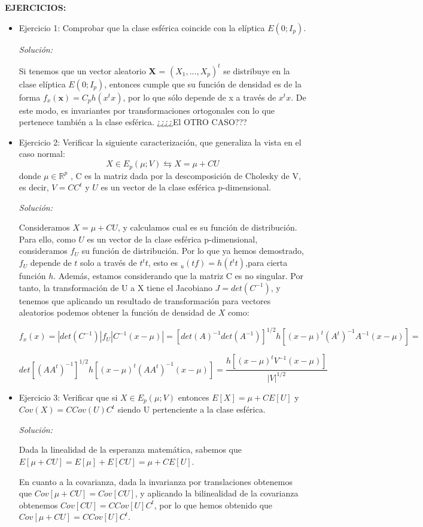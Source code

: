 \documentclass{article}
\theoremstyle{theorem-style}  %
\theoremstyle{definition}
\theoremstyle{example-style}
\begin{document}
	\textbf{EJERCICIOS:}
		\begin{itemize}
			\item Ejercicio 1: Comprobar que la clase esférica coincide con la elíptica $E(0; I_p )$.
			
			\textit{Solución:} 
			
			Si tenemos que un vector aleatorio \textbf{X} = $(X_1, ..., X_p)^t$ se distribuye en la clase elíptica $E(0; I_p )$, entonces cumple que su función de densidad es de la forma $f_x(\textbf{x}) = C_p h (x^tx)$, por lo que sólo depende de x a través de $x^tx$. De este modo, es invariantes por transformaciones ortogonales con lo que pertenece también a la clase esférica. ¿¿¿¿El OTRO CASO???
			
			\item Ejercicio 2: Verificar la siguiente caracterización, que generaliza la vista en el caso normal: $$ X \in E_p(\mu; V) \leftrightarrows X = \mu + CU $$ donde $\mu \in \mathbb{R}^p$ , C es la matriz dada por la descomposición de Cholesky de V, es decir, $V=CC^t$ y $U$ es un vector de la clase esférica p-dimensional.
			
			\textit{Solución:}
			
				Consideramos $X = \mu + CU $, y calculamos cual es su función de distribución. Para ello, como $U$ es un vector de la clase esférica p-dimensional, consideramos $f_U$ su función de distribución. Por lo que ya hemos demostrado, $f_U$ depende de $t$ solo a través de $t^tt$, esto es $_u(tf)=h(t^tt)$,para cierta función $h$. Además, estamos considerando que la matriz C es no singular. Por tanto, la transformación de U a X tiene el Jacobiano $J = det(C^{-1})$, y tenemos que aplicando un resultado de transformación para vectores aleatorios podemos obtener la función de densidad de $X$ como:
				
				\[
					f_x(x) = |det(C^{-1})| f_U |C^{-1}(x-\mu)| = [det(A)^{-1}det(A^{-1})]^{1/2}h[(x-\mu)^t(A^t)^{-1}A^{-1}(x-\mu)] =
				\]
								
				\[
									det[(AA^t)^{-1}]^{1/2}h[(x-\mu)^t(AA^t)^{-1}(x-\mu)] = \frac{h[(x-\mu)^tV^{-1}(x-\mu)]}{|V|^{1/2}}				
				\]
				
				
				
			\item Ejercicio 3: Verificar que si $X \in E_p(\mu; V)$  entonces $E[X] = \mu + CE[U]$ y $Cov(X)= C Cov(U)C^t$ siendo U pertenciente a la clase esférica.
			
			\textit{Solución:}
			
			Dada la linealidad de la esperanza matemática, sabemos que $E[\mu + CU] = E[\mu] + E[CU] = \mu + CE[U]$.
			
			En cuanto a la covarianza, dada la invarianza por translaciones obtenemos que $Cov[\mu + CU] = Cov[CU]$, y aplicando la bilinealidad de la covarianza obtenemos $Cov[CU] = C Cov[U]C^t$, por lo que hemos obtenido que $Cov[\mu + CU] = C Cov[U] C^t$.

		\end{itemize}
		
\end{document}

